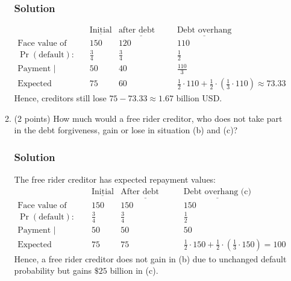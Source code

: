 \documentclass[12pt]{article}
\begin{document}
\begin{enumerate}
\begin{enumerate}
        \subsubsection*{Solution}

        \begin{align*}
            & \underline{\text{Initial}} & \underline{\text{after debt forgiveness}}
            && \underline{\text{Debt overhang}}
            \\ \text{Face value of debt: }  & 150 & 120 && 110 
            \\ \Pr(\text{default}):\        & \frac{3}{4} & \frac{3}{4} && \frac{1}{2}
            \\ \text{Payment | default: }   & 50 & 40 && \frac{110}{3}
            \\ \text{Expected repayment value: } & 75 &60 && \frac{1}{2}\cdot110+\frac{1}{2}\cdot\left(\frac{1}{3}\cdot110\right) \approx 73.33 
        \end{align*}
        Hence, creditors still lose $75 - 73.33 \approx 1.67$ billion USD. 

        \item (2 points) How much would a free rider creditor, who does not take part in the debt forgiveness, gain or lose in situation (b) and (c)?
        \subsubsection*{Solution}

        The free rider creditor has expected repayment values:
        \begin{align*}
            & \underline{\text{Initial}} & \underline{\text{After debt forgiveness (b)}}
            && \underline{\text{Debt overhang (c)}}
            \\ \text{Face value of debt: }  & 150 & 150 && 150 
            \\ \Pr(\text{default}):\        & \frac{3}{4} & \frac{3}{4} && \frac{1}{2}
            \\ \text{Payment | default: }   & 50 & 50 && 50
            \\ \text{Expected repayment value: } & 75 &75 && \frac{1}{2}\cdot150+\frac{1}{2}\cdot\left(\frac{1}{3}\cdot150\right)= 100
        \end{align*}
        Hence, a free rider creditor does not gain in (b) due to unchanged default probability but gains $\$25$ billion in (c).

        
    \end{enumerate}

\end{enumerate}
\end{document}
